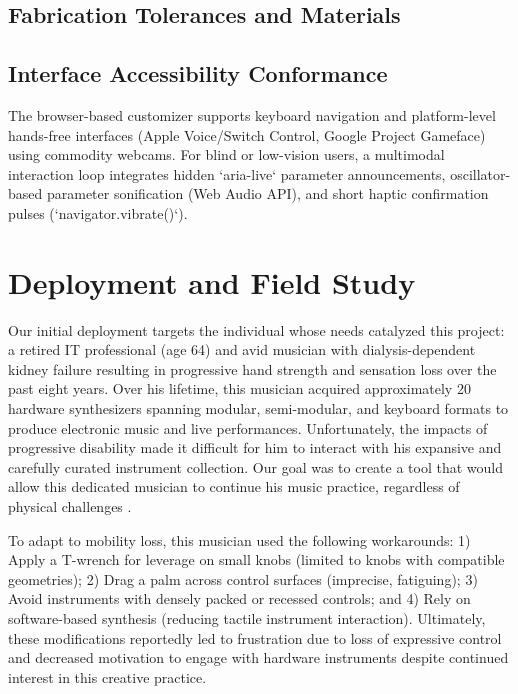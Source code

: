 \documentclass[manuscript,screen,review,anonymous]{acmart}
\begin{document}
\subsection{Fabrication Tolerances and Materials}

\subsection{Interface Accessibility Conformance}
The browser-based customizer supports keyboard navigation and platform-level hands-free interfaces (Apple Voice\slash Switch Control, Google Project Gameface) using commodity webcams. For blind or low-vision users, a multimodal interaction loop integrates hidden `aria-live` parameter announcements, oscillator-based parameter sonification (Web Audio API), and short haptic confirmation pulses (`navigator.vibrate()`). %

\section{Deployment and Field Study}
Our initial deployment targets the individual whose needs catalyzed this project: a retired IT professional (age 64) and avid musician with dialysis-dependent kidney failure resulting in progressive hand strength and sensation loss over the past eight years. Over his lifetime, this musician acquired approximately 20 hardware synthesizers spanning modular, semi-modular, and keyboard formats to produce electronic music and live performances. %
Unfortunately, the impacts of progressive disability made it difficult for him to interact with his expansive and carefully curated instrument collection. Our goal was to create a tool that would allow this dedicated musician to continue his music practice, regardless of physical challenges \cite{mccormack2026jugaad}.

To adapt to mobility loss, this musician used the following workarounds: 1) Apply a T-wrench for leverage on small knobs (limited to knobs with compatible geometries); 2) Drag a palm across control surfaces (imprecise, fatiguing); 3) Avoid instruments with densely packed or recessed controls; and 4) Rely on software-based synthesis (reducing tactile instrument interaction). Ultimately, these modifications reportedly led to frustration due to loss of expressive control and decreased motivation to engage with hardware instruments despite continued interest in this creative practice.
\end{document}
